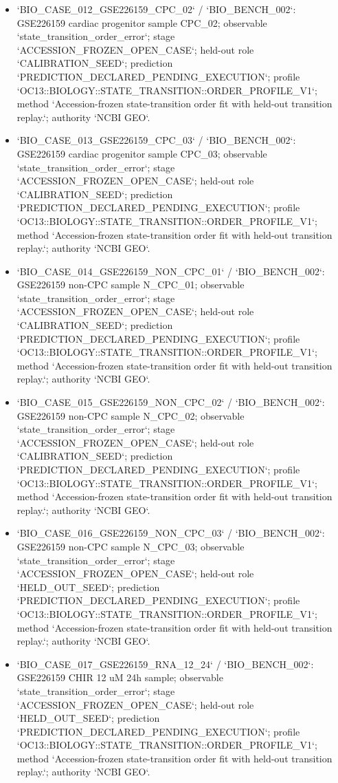 \begin{itemize}
\item `BIO\_CASE\_012\_GSE226159\_CPC\_02` / `BIO\_BENCH\_002`: GSE226159 cardiac progenitor sample CPC\_02; observable `state\_transition\_order\_error`; stage `ACCESSION\_FROZEN\_OPEN\_CASE`; held-out role `CALIBRATION\_SEED`; prediction `PREDICTION\_DECLARED\_PENDING\_EXECUTION`; profile `OC13::BIOLOGY::STATE\_TRANSITION::ORDER\_PROFILE\_V1`; method `Accession-frozen state-transition order fit with held-out transition replay.`; authority `NCBI GEO`.
\item `BIO\_CASE\_013\_GSE226159\_CPC\_03` / `BIO\_BENCH\_002`: GSE226159 cardiac progenitor sample CPC\_03; observable `state\_transition\_order\_error`; stage `ACCESSION\_FROZEN\_OPEN\_CASE`; held-out role `CALIBRATION\_SEED`; prediction `PREDICTION\_DECLARED\_PENDING\_EXECUTION`; profile `OC13::BIOLOGY::STATE\_TRANSITION::ORDER\_PROFILE\_V1`; method `Accession-frozen state-transition order fit with held-out transition replay.`; authority `NCBI GEO`.
\item `BIO\_CASE\_014\_GSE226159\_NON\_CPC\_01` / `BIO\_BENCH\_002`: GSE226159 non-CPC sample N\_CPC\_01; observable `state\_transition\_order\_error`; stage `ACCESSION\_FROZEN\_OPEN\_CASE`; held-out role `CALIBRATION\_SEED`; prediction `PREDICTION\_DECLARED\_PENDING\_EXECUTION`; profile `OC13::BIOLOGY::STATE\_TRANSITION::ORDER\_PROFILE\_V1`; method `Accession-frozen state-transition order fit with held-out transition replay.`; authority `NCBI GEO`.
\item `BIO\_CASE\_015\_GSE226159\_NON\_CPC\_02` / `BIO\_BENCH\_002`: GSE226159 non-CPC sample N\_CPC\_02; observable `state\_transition\_order\_error`; stage `ACCESSION\_FROZEN\_OPEN\_CASE`; held-out role `CALIBRATION\_SEED`; prediction `PREDICTION\_DECLARED\_PENDING\_EXECUTION`; profile `OC13::BIOLOGY::STATE\_TRANSITION::ORDER\_PROFILE\_V1`; method `Accession-frozen state-transition order fit with held-out transition replay.`; authority `NCBI GEO`.
\item `BIO\_CASE\_016\_GSE226159\_NON\_CPC\_03` / `BIO\_BENCH\_002`: GSE226159 non-CPC sample N\_CPC\_03; observable `state\_transition\_order\_error`; stage `ACCESSION\_FROZEN\_OPEN\_CASE`; held-out role `HELD\_OUT\_SEED`; prediction `PREDICTION\_DECLARED\_PENDING\_EXECUTION`; profile `OC13::BIOLOGY::STATE\_TRANSITION::ORDER\_PROFILE\_V1`; method `Accession-frozen state-transition order fit with held-out transition replay.`; authority `NCBI GEO`.
\item `BIO\_CASE\_017\_GSE226159\_RNA\_12\_24` / `BIO\_BENCH\_002`: GSE226159 CHIR 12 uM 24h sample; observable `state\_transition\_order\_error`; stage `ACCESSION\_FROZEN\_OPEN\_CASE`; held-out role `HELD\_OUT\_SEED`; prediction `PREDICTION\_DECLARED\_PENDING\_EXECUTION`; profile `OC13::BIOLOGY::STATE\_TRANSITION::ORDER\_PROFILE\_V1`; method `Accession-frozen state-transition order fit with held-out transition replay.`; authority `NCBI GEO`.

\end{itemize}
